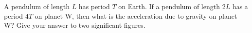 A pendulum of length $L$ has period $T$ on Earth. If a pendulum of
length $2L$ has a period $4T$ on planet W, then what is the
acceleration due to gravity on planet W? Give your answer to two
significant figures.\answercheck
